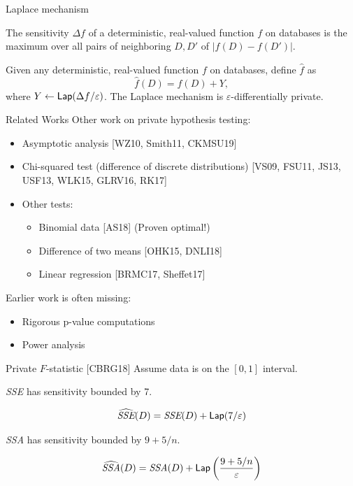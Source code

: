 \documentclass{beamer}
\newcommand{\sse}{\textit{SSE}\xspace}
\newcommand{\ssa}{\textit{SSA}\xspace}
\newcommand{\lap}{\ensuremath{{\sf Lap}}\xspace}
\begin{document}
\begin{frame}{Laplace mechanism}
\begin{definition}[Sensitivity]
The sensitivity $\Delta f$ of a deterministic, real-valued function $f$ on databases is the maximum over all pairs of neighboring $D, D'$ of $| f(D) - f(D') |$.
\end{definition}

\pause
\begin{theorem}
Given any deterministic, real-valued function $f$ on databases, define $\widehat{f}$ as
$$\widehat{f}(D) = f(D) + Y,$$
where $Y \leftarrow \lap(\Delta f/\varepsilon)$. The Laplace mechanism is $\varepsilon$-differentially private.
\end{theorem}
\end{frame}

\begin{frame}{Related Works}
    Other work on private hypothesis testing:\pause
\begin{itemize}
\item Asymptotic analysis [WZ10, Smith11, CKMSU19] \pause
\item Chi-squared test (difference of discrete distributions) [VS09, FSU11, JS13, USF13, WLK15, GLRV16, RK17] \pause
\item Other tests: \pause
\begin{itemize}
\item Binomial data [AS18] (Proven optimal!) \pause
\item Difference of two means [OHK15, DNLI18] \pause
\item Linear regression [BRMC17, Sheffet17] \pause
\end{itemize}
\end{itemize}
Earlier work is often missing: \pause
\begin{itemize}
\item Rigorous p-value computations \pause
\item Power analysis
\end{itemize}
\end{frame}

\begin{frame}{Private $F$-statistic [CBRG18]}
Assume data is on the $[0,1]$ interval. \pause
\begin{theorem}
\sse has sensitivity bounded by 7.
\end{theorem}
\pause
$$\widehat{\sse}(D) = \sse(D) + \lap(7/\varepsilon) $$
\pause
\begin{theorem}
\ssa has sensitivity bounded by $9 + 5/n$.
\end{theorem}
\pause
$$\widehat{\ssa}(D) = \ssa(D) + \lap\left(\frac{9+5/n}{\varepsilon}\right) $$
\end{frame}
\end{document}
